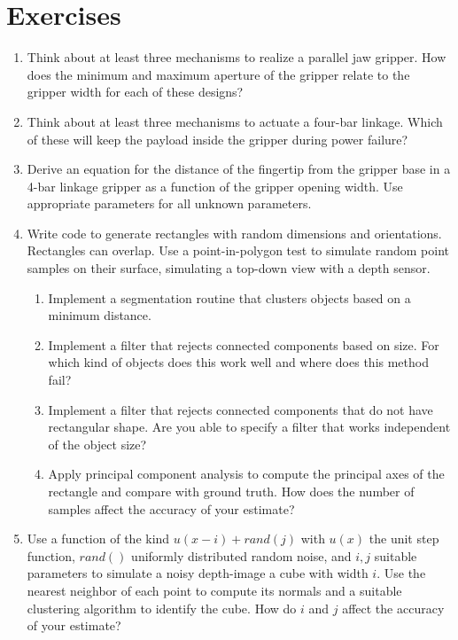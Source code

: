 
\section{Exercises}
\begin{enumerate}
\item Think about at least three mechanisms to realize a parallel jaw gripper. How does the minimum and maximum aperture of the gripper relate to the gripper width for each of these designs?
\item Think about at least three mechanisms to actuate a four-bar linkage. Which of these will keep the payload inside the gripper during power failure?
\item Derive an equation for the distance of the fingertip from the gripper base in a 4-bar linkage gripper as a function of the gripper opening width. Use appropriate parameters for all unknown parameters. 
\item Write code to generate rectangles with random dimensions and orientations. Rectangles can overlap. Use a point-in-polygon test to simulate random point samples on their surface, simulating a top-down view with a depth sensor.
\begin{enumerate}
\item Implement a segmentation routine that clusters objects based on a minimum distance.
\item Implement a filter that rejects connected components based on size. For which kind of objects does this work well and where does this method fail?
\item Implement a filter that rejects connected components that do not have rectangular shape. Are you able to specify a filter that works independent of the object size?
\item Apply principal component analysis to compute the principal axes of the rectangle and compare with ground truth. How does the number of samples affect the accuracy of your estimate?
\end{enumerate}
\item Use a function of the kind $u(x-i)+rand(j)$ with $u(x)$ the unit step function, $rand()$ uniformly distributed random noise, and $i,j$ suitable parameters to simulate a noisy depth-image a cube with width $i$. Use the nearest neighbor of each point to compute its normals and a suitable clustering algorithm to identify the cube. How do $i$ and $j$ affect the accuracy of your estimate?
\end{enumerate}
